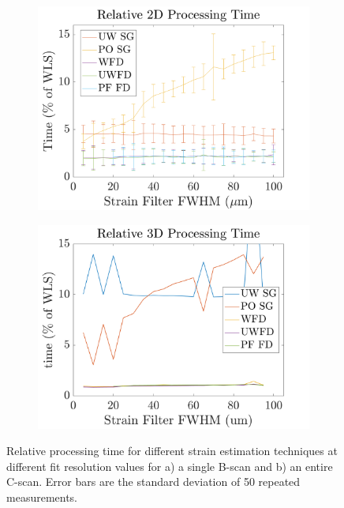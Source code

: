 \begin{figure}[b!]
	\centering
    \begin{subfigure}{0.49\textwidth}
    	\centering
        \includegraphics[width=\textwidth]{figures/2d_relative_fr.png}
    \end{subfigure}
    \begin{subfigure}{0.49\textwidth}
    	\centering
        \includegraphics[width=\textwidth]{figures/3d_relative_fr.png}
    \end{subfigure}
    \caption{Relative processing time for different strain estimation techniques at different fit resolution values for a) a single B-scan and b) an entire C-scan. Error bars are the standard deviation of 50 repeated measurements.}
    \label{process_time_1}
\end{figure}

